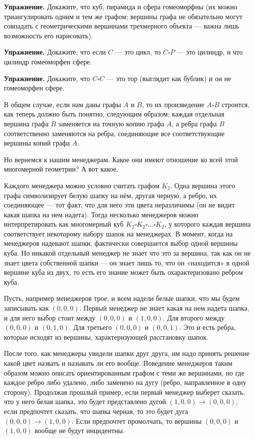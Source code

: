{\bfseries Упражнение.} Докажите, что куб, пирамида и сфера гомеоморфны (их можно триангулировать одним и тем же графом; вершины графа не обязательно могут совпадать с геометрическими вершинами трехмерного объекта — важна лишь возможность его нарисовать).

{\bfseries Упражнение.} Докажите, что если $C$ — это цикл, то $C\square P$ — это цилиндр, и что цилиндр гомеоморфен сфере.

{\bfseries Упражнение.} Докажите, что $C\square C$ — это тор (выглядит как бублик) и он не гомеоморфен сфере.

В общем случае, если нам даны графы $A$ и $B$, то их произведение $A\square B$ строится, как теперь должно быть понятно, следующим образом: каждая отдельная вершина графа $B$ заменяется на точную копию графа $A$, а ребра графа $B$ соответственно заменяются на ребра, соединяющие все соответствующие вершины копий графа $A$.

Но вернемся к нашим менеджерам. Какое они имеют отношение ко всей этой многомерной геометрии? А вот какое.

Каждого менеджера можно условно считать графом $K_2$. Одна вершина этого графа символизирует белую шапку на нём, другая черную, а ребро, их соединяющее — тот факт, что для него эти цвета неразличимы (он не видит какая шапка на нем надета). Тогда несколько менеджеров можно интерпретировать как многомерный куб $K_2 \square K_2 \square \ldots \square K_2$, у которого каждая вершина соответствует некоторому набору шапок на менеджерах. В момент, когда на менеджеров надевают шапки, фактически совершается выбор одной вершины куба. Но никакой отдельный менеджер не знает что это за вершина, так как он не знает цвета собственной шапки — он знает лишь то, что он «находится» в одной вершине куба из двух, то есть его знание может быть охарактеризовано ребром куба.

Пусть, например менеджеров трое, и всем надели белые шапки, что мы будем записывать как $(0, 0, 0)$. Первый менеджер не знает какая на нем надета шапка, и для него выбор стоит между $(0, 0, 0)$ и $(1, 0, 0)$. Для второго между $(0, 0, 0)$ и $(0, 1, 0)$. Для третьего $(0, 0, 0)$ и $(0, 0, 1)$. Это и есть ребра, которые исходят из вершины, характеризующей расстановку шапок.

После того, как менеджеры увидели шапки друг друга, им надо принять решение какой цвет назвать и называть ли его вообще. Поведение менеджеров таким образом можно описать ориентированным графом с теми же вершинами, но где каждое ребро либо удалено, либо заменено на дугу (ребро, направленное в одну сторону). Продолжая прошлый пример, если первый менеджер выберет сказать, что у него белая шапка, это будет представлено дугой $(1,0,0)\to (0, 0, 0)$, если предпочтет сказать, что шапка черная, то это будет дуга $(0, 0, 0)\to (1, 0,0)$. Если предпочтет промолчать, то вершины $(0, 0, 0)$ и $(1, 0, 0)$ вообще не будут инцидентны.

